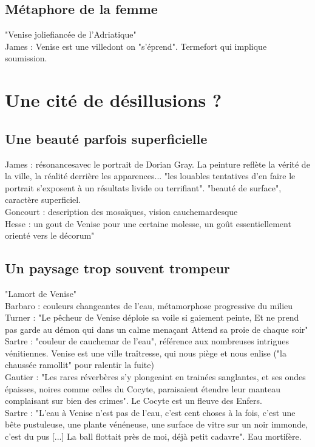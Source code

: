 \documentclass[a4paper,10pt]{article}
\begin{document}
	\subsection{Métaphore de la femme}
		"Venise joliefiancée de l'Adriatique"\\
		James \cite{James1909} : Venise est une villedont on "s'éprend". Termefort qui implique soumission.

		
			
			
\section{Une cité de désillusions ?}
	\subsection{Une beauté parfois superficielle}
		James \cite{James1909} : résonancesavec le portrait de Dorian Gray. La peinture reflète la vérité de la ville, la réalité derrière les apparences... "les louables tentatives d'en faire le portrait s'exposent à un résultats livide ou terrifiant". "beauté de surface", caractère superficiel.\\
		Goncourt \cite{Goncourt1855} : description des mosaïques, vision cauchemardesque\\
		Hesse \cite{Hesse1901} : un gout de Venise pour une certaine molesse, un goût essentiellement orienté vers le décorum"\\
	\subsection{Un paysage trop souvent trompeur}
		"Lamort de Venise"\\
		Barbaro \cite{Barbaro1990} : couleurs changeantes de l'eau, métamorphose progressive du milieu\\
		Turner \cite{Turner1843} : "Le pêcheur de Venise déploie sa voile si gaiement peinte, Et ne prend pas garde au démon qui dans un calme menaçant Attend sa proie de chaque soir"\\
		Sartre \cite{Sartre1964} : "couleur de cauchemar de l'eau", référence aux nombreuses intrigues vénitiennes. Venise est une ville traîtresse, qui nous piège et nous enlise ("la chaussée ramollit" pour ralentir la fuite)\\
		Gautier \cite{Gautier1852} : "Les rares réverbères s'y plongeaint en trainées sanglantes, et ses ondes épaisses, noires comme celles du Cocyte, paraisaient étendre leur manteau complaisant sur bien des crimes". Le Cocyte est un fleuve des Enfers.\\
		Sartre \cite{Sartre1952} : "L'eau à Venise n'est pas de l'eau, c'est cent choses à la fois, c'est une bête pustuleuse, une plante vénéneuse, une surface de vitre sur un noir immonde, c'est du pus [...] La ball flottait près de moi, déjà petit cadavre". Eau mortifère.\\
		
\end{document}
